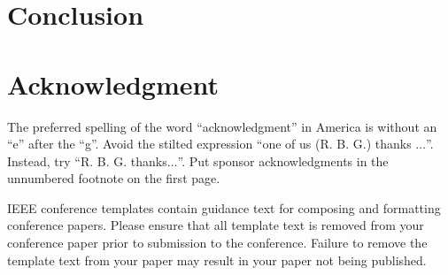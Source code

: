 \documentclass[conference]{IEEEtran}
\begin{document}
\section{Conclusion}

\section*{Acknowledgment}

The preferred spelling of the word ``acknowledgment'' in America is without 
an ``e'' after the ``g''. Avoid the stilted expression ``one of us (R. B. 
G.) thanks $\ldots$''. Instead, try ``R. B. G. thanks$\ldots$''. Put sponsor 
acknowledgments in the unnumbered footnote on the first page.




\vspace{12pt}
\color{red}
IEEE conference templates contain guidance text for composing and formatting conference papers. Please ensure that all template text is removed from your conference paper prior to submission to the conference. Failure to remove the template text from your paper may result in your paper not being published.
\end{document}
